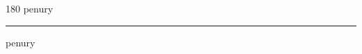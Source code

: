 
\begin{frame}
\begin{center}
\begin{turn}{180}
{\fontsize{2.5cm}{1em}\selectfont penury}
\end{turn}
\vspace{1em}\par  
\hrule
\vspace{1em}\par  
{\fontsize{2.5cm}{1em}\selectfont penury}
\end{center}
\end{frame}
